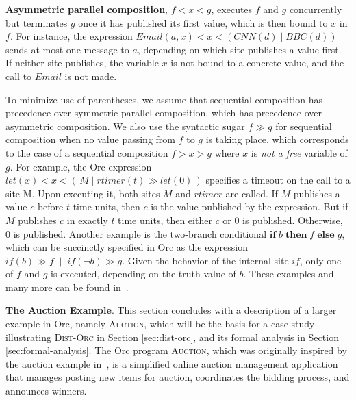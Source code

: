\documentclass{eptcs}
\begin{document}
\textbf{Asymmetric parallel composition}, $f < x < g$, executes $f$ and $g$ concurrently but terminates $g$ once it has published its first value, which is then bound to $x$ in $f$. For instance, the expression $\mathit{Email} (a, x) < x < (\mathit{CNN}(d) \;|\; \mathit{BBC}(d))$ sends at most one message to $a$, depending on which site publishes a value first. If neither site publishes, the variable $x$ is not bound to a concrete value, and the call to $Email$ is not made.




To minimize use of parentheses, we assume that sequential composition has precedence over symmetric parallel composition, which has precedence over asymmetric composition. We also use the syntactic sugar $f \gg g$ for sequential composition when no value passing from $f$ to $g$ is taking place, which corresponds to the case of a sequential composition $f > x > g$ where $x$ is \emph{not a free} variable of $g$. For example, the Orc expression $\mathit{let}(x) < x < (\, M \;|\; \mathit{rtimer}(t) \gg let(0)\, )$ specifies a timeout on the call to a site M. 
Upon executing it, both sites $M$ and $rtimer$ are called. If $M$ publishes a value $c$ before $t$ time units, then $c$ is the value published by the expression. But if $M$ publishes $c$ in exactly $t$ time units, then either $c$ or $0$ is published. Otherwise, $0$ is published.
Another example is the two-branch conditional $\mathbf{if}\;b\;\mathbf{then}\;f\;\mathbf{else}\;g$, which can be succinctly specified in Orc as the expression $\mathit{if}(b) \gg f \;\;|\;\; \mathit{if}(\neg b) \gg g$. 
Given the behavior of the internal site $\mathit{if}$, only one of $f$ and $g$ is executed, depending on the truth value of $b$. 
These examples and many more can be found in~\cite{OrcTheory05}.

\textbf{The Auction Example}. This section concludes with a description of a larger example in Orc, namely \textsc{Auction}, which will be the basis for a case study illustrating \textsc{Dist-Orc} in Section \ref{sec:dist-orc}, and its formal analysis in Section \ref{sec:formal-analysis}.
The Orc program \textsc{Auction}, which was originally inspired by the auction example in~\cite{OrcTheory05}, is a simplified online auction management application that manages posting new items for auction, coordinates the bidding process, and announces winners. 
\end{document}
